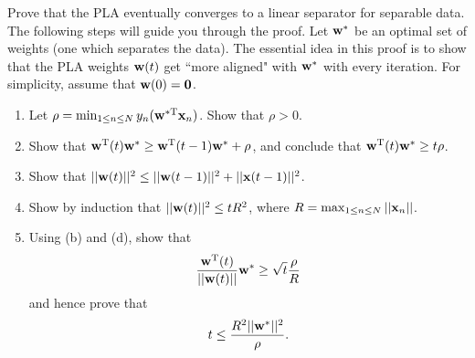 \documentclass{amsart}
\begin{document}
\begin{problem}[1.3]
  Prove that the PLA eventually converges to a linear separator for separable
  data. The following steps will guide you through the proof. Let \({\bf w}^*\)
  be an optimal set of weights (one which separates the data). The essential
  idea in this proof is to show that the PLA weights \({\bf w}(t)\) get ``more
  aligned" with \({\bf w}^*\) with every iteration. For simplicity, assume that
  \({\bf w}(0) = {\bf 0}\).
  \begin{enumerate}
    \item Let \(\rho = \min_{1\leq n\leq N}
      y_n({\bf w}^{*\textup{T}}{\bf x}_n)\). Show that
      \(\rho > 0\).
    \item Show that \({\bf w}^\textup{T}(t){\bf w}^* \geq
      {\bf w}^\textup{T}(t-1){\bf w}^* + \rho\), and conclude that
      \({\bf w}^\textup{T}(t){\bf w}^* \geq t\rho\).
    \item Show that \(||{\bf w}(t)||^2 \leq
      ||{\bf w}(t-1)||^2 + ||{\bf x}(t-1)||^2\).
    \item Show by induction that \(||{\bf w}(t)||^2 \leq tR^2\), where
      \(R = \max_{1\leq n\leq N}||{\bf x}_n||\).
    \item Using (b) and (d), show that
      \begin{equation*}
        \frac{{\bf w}^\textup{T}(t)}{||{\bf w}(t)||} {\bf w}^*
          \geq \sqrt{t} \frac{\rho}{R}
      \end{equation*}
      and hence prove that
      \begin{equation*}
        t \leq \frac{R^2||{\bf w}^*||^2}{\rho}.
      \end{equation*}
  \end{enumerate}
\end{problem}
\end{document}
